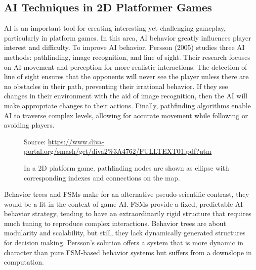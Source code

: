 \documentclass[12pt,oneside,openright,a4paper]{cpe-english-project}
\begin{document}
\subsection{AI Techniques in 2D Platformer Games}
AI is an important tool for creating interesting yet challenging gameplay, particularly in platform games. In this area, AI behavior greatly influences player interest and difficulty. To improve AI behavior, Persson (2005)\cite {platformer_ai} studies three AI methods: pathfinding, image recognition, and line of sight. Their research focuses on AI movement and perception for more realistic interactions. The detection of line of sight ensures that the opponents will never see the player unless there are no obstacles in their path, preventing their irrational behavior. If they see changes in their environment with the aid of image recognition, then the AI will make appropriate changes to their actions. Finally, pathfinding algorithms enable AI to traverse complex levels, allowing for accurate movement while following or avoiding players.\par
\begin{figure}[!h]
\centering
{}
\caption{In a 2D platform game, pathfinding nodes are shown as ellipse with corresponding indexes and connections on the map.}\label{fig:AITechniq}
Source:
\href{https://www.diva-portal.org/smash/get/diva2\%3A4762/FULLTEXT01.pdf?utm\_source=chatgpt.com}{https://www.diva-portal.org/smash/get/diva2\%3A4762/FULLTEXT01.pdf?utm}
\end{figure}
Behavior trees and FSMs make for an alternative pseudo-scientific contrast, they would be a fit in the context of game AI. FSMs provide a fixed, predictable AI behavior strategy, tending to have an extraordinarily rigid structure that requires much tuning to reproduce complex interactions. Behavior trees are about modularity and scalability, but still, they lack dynamically generated structures for decision making. Persson's solution offers a system that is more dynamic in character than pure FSM-based behavior systems but suffers from a downslope in computation.\par
\newpage
\end{document}

